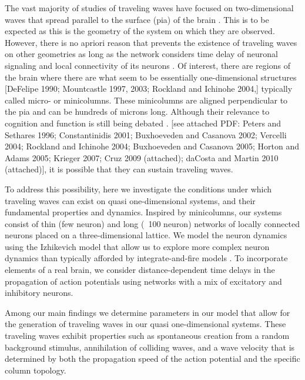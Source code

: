 \documentclass[a4paper,11pt]{article}
\begin{document}
The vast majority of studies of traveling waves have focused on two-dimensional waves that spread parallel to the surface (pia) of the brain \cite{reimer2010}\cite{keane2015}. 
This is to be expected as this is the geometry of the system on which they are observed. 
However, there is no apriori reason that prevents the existence of traveling waves on other geometries as long as the network considers time delay of neuronal signaling and local connectivity of its neurons \cite{ermentrout2001}\cite{senk2020}. 
Of interest, there are regions of the brain where there are what seem to be essentially one-dimensional structures [DeFelipe 1990; Mountcastle 1997, 2003; Rockland and Ichinohe 2004,] typically called micro- or minicolumns. 
These minicolumns are aligned perpendicular to the pia and can be hundreds of microns long.  
Although their relevance to cognition and function is still being debated \cite{horton2005}\cite{cruz2009}\cite{daCosta2010}\cite{buxhoeveden2002}. [see attached PDF: Peters and Sethares 1996;  Constantinidis 2001; Buxhoeveden and Casanova 2002; Vercelli 2004; Rockland and Ichinohe 2004; Buxhoeveden and Casanova 2005; Horton and Adams 2005; Krieger 2007; Cruz 2009 (attached); daCosta and Martin 2010 (attached)], it is possible that they can sustain traveling waves.

To address this possibility, here we investigate the conditions under which traveling waves can exist on quasi one-dimensional systems, and their fundamental properties and dynamics.  
Inspired by minicolumns, our systems consist of thin (few neuron) and long (~100 neuron) networks of locally connected neurons placed on a three-dimensional lattice.  
We model the neuron dynamics using the Izhikevich model \cite{izhikevich2003} that allow us to explore more complex neuron dynamics than typically afforded by integrate-and-fire models \cite{keane2015}\cite{senk2020}. 
To incorporate elements of a real brain, we consider distance-dependent time delays in the propagation of action potentials using networks with a mix of excitatory and inhibitory neurons.

Among our main findings we determine parameters in our model that allow for the generation of traveling waves in our quasi one-dimensional systems. 
These traveling waves exhibit properties such as spontaneous creation from a random background stimulus, annihilation of colliding waves, and a wave velocity that is determined by both the propagation speed of the action potential and the specific column topology.
\end{document}
